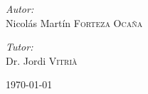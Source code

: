 \begin{titlepage}
\begin{multicols}{2}
\begin{flushleft}
\emph{Autor:}\\
Nicolás Martín \textsc{Forteza Ocaña}\\[3cm] %
\vfill
\columnbreak
\end{flushleft}

\begin{flushright}
\emph{Tutor:}\\
Dr. Jordi \textsc{Vitrià}\\[3cm] %
\vfill
\end{flushright}

\end{multicols}
\vspace{3cm}




{\large \today}\\[3cm] %


 

\vfill %

\end{titlepage}
